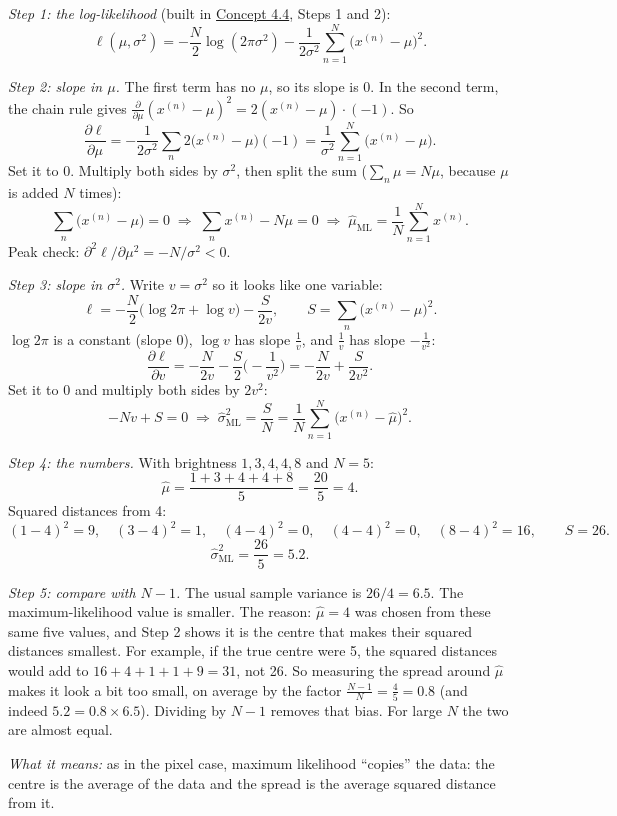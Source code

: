 \documentclass[12pt,a4paper]{article}
\begin{document}
\emph{Step 1: the log-likelihood} (built in \hyperref[c4-4]{Concept 4.4}, Steps 1 and 2):
\[
\ell(\mu,\sigma^2)=-\frac N2\log(2\pi\sigma^2)-\frac{1}{2\sigma^2}\sum_{n=1}^{N}\big(x^{(n)}-\mu\big)^2 .
\]

\emph{Step 2: slope in $\mu$.} The first term has no $\mu$, so its slope is 0. In the second term, the chain rule gives $\frac{\partial}{\partial\mu}(x^{(n)}-\mu)^2=2(x^{(n)}-\mu)\cdot(-1)$. So
\[
\frac{\partial\ell}{\partial\mu}=-\frac{1}{2\sigma^2}\sum_{n}2\big(x^{(n)}-\mu\big)(-1)=\frac{1}{\sigma^2}\sum_{n=1}^{N}\big(x^{(n)}-\mu\big).
\]
Set it to 0. Multiply both sides by $\sigma^2$, then split the sum ($\sum_n\mu=N\mu$, because $\mu$ is added $N$ times):
\[
\sum_n\big(x^{(n)}-\mu\big)=0\;\Rightarrow\;\sum_n x^{(n)}-N\mu=0\;\Rightarrow\;\hat\mu_{\text{ML}}=\frac1N\sum_{n=1}^{N}x^{(n)} .
\]
Peak check: $\partial^2\ell/\partial\mu^2=-N/\sigma^2<0$.

\emph{Step 3: slope in $\sigma^2$.} Write $v=\sigma^2$ so it looks like one variable:
\[
\ell=-\frac N2\big(\log2\pi+\log v\big)-\frac{S}{2v},\qquad S=\sum_n\big(x^{(n)}-\mu\big)^2 .
\]
$\log2\pi$ is a constant (slope 0), $\log v$ has slope $\frac1v$, and $\frac1v$ has slope $-\frac{1}{v^2}$:
\[
\frac{\partial\ell}{\partial v}=-\frac{N}{2v}-\frac S2\Big(-\frac{1}{v^2}\Big)=-\frac{N}{2v}+\frac{S}{2v^2}.
\]
Set it to 0 and multiply both sides by $2v^2$:
\[
-Nv+S=0\;\Rightarrow\;\hat\sigma^2_{\text{ML}}=\frac SN=\frac1N\sum_{n=1}^{N}\big(x^{(n)}-\hat\mu\big)^2 .
\]

\emph{Step 4: the numbers.} With brightness $1,3,4,4,8$ and $N=5$:
\[
\hat\mu=\frac{1+3+4+4+8}{5}=\frac{20}{5}=4 .
\]
Squared distances from 4:
\[
(1-4)^2=9,\quad(3-4)^2=1,\quad(4-4)^2=0,\quad(4-4)^2=0,\quad(8-4)^2=16,\qquad S=26 .
\]
\[
\hat\sigma^2_{\text{ML}}=\frac{26}{5}=5.2 .
\]

\emph{Step 5: compare with $N-1$.} The usual sample variance is $26/4=6.5$. The maximum-likelihood value is smaller. The reason: $\hat\mu=4$ was chosen from these same five values, and Step 2 shows it is the centre that makes their squared distances smallest. For example, if the true centre were 5, the squared distances would add to $16+4+1+1+9=31$, not 26. So measuring the spread around $\hat\mu$ makes it look a bit too small, on average by the factor $\frac{N-1}{N}=\frac45=0.8$ (and indeed $5.2=0.8\times6.5$). Dividing by $N-1$ removes that bias. For large $N$ the two are almost equal.

\emph{What it means:} as in the pixel case, maximum likelihood ``copies'' the data: the centre is the average of the data and the spread is the average squared distance from it.
\newpage
\end{document}
